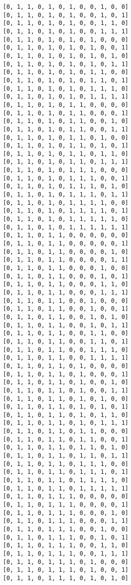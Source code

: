 \documentclass[11pt]{article}
\begin{document}
\begin{Verbatim}[commandchars=\\\{\}]
[0, 1, 1, 0, 1, 0, 1, 0, 0, 1, 0, 0]
[0, 1, 1, 0, 1, 0, 1, 0, 0, 1, 0, 1]
[0, 1, 1, 0, 1, 0, 1, 0, 0, 1, 1, 0]
[0, 1, 1, 0, 1, 0, 1, 0, 0, 1, 1, 1]
[0, 1, 1, 0, 1, 0, 1, 0, 1, 0, 0, 0]
[0, 1, 1, 0, 1, 0, 1, 0, 1, 0, 0, 1]
[0, 1, 1, 0, 1, 0, 1, 0, 1, 0, 1, 0]
[0, 1, 1, 0, 1, 0, 1, 0, 1, 0, 1, 1]
[0, 1, 1, 0, 1, 0, 1, 0, 1, 1, 0, 0]
[0, 1, 1, 0, 1, 0, 1, 0, 1, 1, 0, 1]
[0, 1, 1, 0, 1, 0, 1, 0, 1, 1, 1, 0]
[0, 1, 1, 0, 1, 0, 1, 0, 1, 1, 1, 1]
[0, 1, 1, 0, 1, 0, 1, 1, 0, 0, 0, 0]
[0, 1, 1, 0, 1, 0, 1, 1, 0, 0, 0, 1]
[0, 1, 1, 0, 1, 0, 1, 1, 0, 0, 1, 0]
[0, 1, 1, 0, 1, 0, 1, 1, 0, 0, 1, 1]
[0, 1, 1, 0, 1, 0, 1, 1, 0, 1, 0, 0]
[0, 1, 1, 0, 1, 0, 1, 1, 0, 1, 0, 1]
[0, 1, 1, 0, 1, 0, 1, 1, 0, 1, 1, 0]
[0, 1, 1, 0, 1, 0, 1, 1, 0, 1, 1, 1]
[0, 1, 1, 0, 1, 0, 1, 1, 1, 0, 0, 0]
[0, 1, 1, 0, 1, 0, 1, 1, 1, 0, 0, 1]
[0, 1, 1, 0, 1, 0, 1, 1, 1, 0, 1, 0]
[0, 1, 1, 0, 1, 0, 1, 1, 1, 0, 1, 1]
[0, 1, 1, 0, 1, 0, 1, 1, 1, 1, 0, 0]
[0, 1, 1, 0, 1, 0, 1, 1, 1, 1, 0, 1]
[0, 1, 1, 0, 1, 0, 1, 1, 1, 1, 1, 0]
[0, 1, 1, 0, 1, 0, 1, 1, 1, 1, 1, 1]
[0, 1, 1, 0, 1, 1, 0, 0, 0, 0, 0, 0]
[0, 1, 1, 0, 1, 1, 0, 0, 0, 0, 0, 1]
[0, 1, 1, 0, 1, 1, 0, 0, 0, 0, 1, 0]
[0, 1, 1, 0, 1, 1, 0, 0, 0, 0, 1, 1]
[0, 1, 1, 0, 1, 1, 0, 0, 0, 1, 0, 0]
[0, 1, 1, 0, 1, 1, 0, 0, 0, 1, 0, 1]
[0, 1, 1, 0, 1, 1, 0, 0, 0, 1, 1, 0]
[0, 1, 1, 0, 1, 1, 0, 0, 0, 1, 1, 1]
[0, 1, 1, 0, 1, 1, 0, 0, 1, 0, 0, 0]
[0, 1, 1, 0, 1, 1, 0, 0, 1, 0, 0, 1]
[0, 1, 1, 0, 1, 1, 0, 0, 1, 0, 1, 0]
[0, 1, 1, 0, 1, 1, 0, 0, 1, 0, 1, 1]
[0, 1, 1, 0, 1, 1, 0, 0, 1, 1, 0, 0]
[0, 1, 1, 0, 1, 1, 0, 0, 1, 1, 0, 1]
[0, 1, 1, 0, 1, 1, 0, 0, 1, 1, 1, 0]
[0, 1, 1, 0, 1, 1, 0, 0, 1, 1, 1, 1]
[0, 1, 1, 0, 1, 1, 0, 1, 0, 0, 0, 0]
[0, 1, 1, 0, 1, 1, 0, 1, 0, 0, 0, 1]
[0, 1, 1, 0, 1, 1, 0, 1, 0, 0, 1, 0]
[0, 1, 1, 0, 1, 1, 0, 1, 0, 0, 1, 1]
[0, 1, 1, 0, 1, 1, 0, 1, 0, 1, 0, 0]
[0, 1, 1, 0, 1, 1, 0, 1, 0, 1, 0, 1]
[0, 1, 1, 0, 1, 1, 0, 1, 0, 1, 1, 0]
[0, 1, 1, 0, 1, 1, 0, 1, 0, 1, 1, 1]
[0, 1, 1, 0, 1, 1, 0, 1, 1, 0, 0, 0]
[0, 1, 1, 0, 1, 1, 0, 1, 1, 0, 0, 1]
[0, 1, 1, 0, 1, 1, 0, 1, 1, 0, 1, 0]
[0, 1, 1, 0, 1, 1, 0, 1, 1, 0, 1, 1]
[0, 1, 1, 0, 1, 1, 0, 1, 1, 1, 0, 0]
[0, 1, 1, 0, 1, 1, 0, 1, 1, 1, 0, 1]
[0, 1, 1, 0, 1, 1, 0, 1, 1, 1, 1, 0]
[0, 1, 1, 0, 1, 1, 0, 1, 1, 1, 1, 1]
[0, 1, 1, 0, 1, 1, 1, 0, 0, 0, 0, 0]
[0, 1, 1, 0, 1, 1, 1, 0, 0, 0, 0, 1]
[0, 1, 1, 0, 1, 1, 1, 0, 0, 0, 1, 0]
[0, 1, 1, 0, 1, 1, 1, 0, 0, 0, 1, 1]
[0, 1, 1, 0, 1, 1, 1, 0, 0, 1, 0, 0]
[0, 1, 1, 0, 1, 1, 1, 0, 0, 1, 0, 1]
[0, 1, 1, 0, 1, 1, 1, 0, 0, 1, 1, 0]
[0, 1, 1, 0, 1, 1, 1, 0, 0, 1, 1, 1]
[0, 1, 1, 0, 1, 1, 1, 0, 1, 0, 0, 0]
[0, 1, 1, 0, 1, 1, 1, 0, 1, 0, 0, 1]
[0, 1, 1, 0, 1, 1, 1, 0, 1, 0, 1, 0]

\end{Verbatim}
\end{document}
